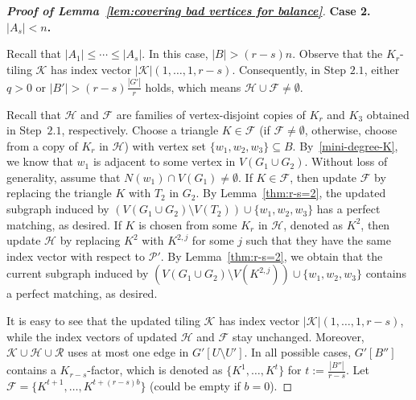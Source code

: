 \documentclass[11pt, a4paper]{article}
\theoremstyle{definition}
\newcommand{\<}{\subseteq}
\begin{document}
\begin{proof}[{\bf Proof of Lemma~\ref{lem:covering bad vertices for balance}}]
\medskip
{\bf Case 2. $|A_s|<n$.}
\medskip

{Recall that $|A_1|\le \cdots\le |A_s|$. In this case,  $|B|>(r-s)n$. Observe that the $K_r$-tiling  $\mathcal{K}$ has index vector $|\mathcal{K}|(1,\ldots,1,r-s)$. Consequently, in Step $2.1$, either $q>0$  or $|B'|>(r-s)\frac{|G'|}{r}$ holds, which means \(\mathcal{H} \cup \mathcal{F} \ne \emptyset\).}

{Recall that $\mathcal{H}$ and $\mathcal{F}$ are families of vertex-disjoint copies of $K_r$ and $K_3$ obtained in Step~$2.1$, respectively.}
Choose a triangle $K\in \mathcal{F}$ (if $\mathcal{F}\neq \emptyset$, otherwise, choose from a {copy of} $K_r$ in $\mathcal{H}$) with vertex set $\{w_1,w_2,w_3\}\<B$. By~\eqref{mini-degree-K}, we know that $w_1$ is adjacent to some vertex in $V(G_1\cup G_2)$. Without loss of generality, assume that $N(w_1)\cap V(G_1)\neq \emptyset$.  If $K\in\mathcal{F}$, then update $\mathcal{F}$ by replacing the triangle $K$ with $T_2$ in $G_{2}$. By Lemma~\ref{thm:r-s=2}, the updated subgraph induced by  {$ (V(G_1\cup G_2)\setminus   V(T_2))\cup \{w_1,w_2,w_3\}$} has a perfect matching, as desired. If $K$ is chosen from some $K_r$ in $\mathcal{H}$, denoted as $K^2$, then update $\mathcal{H}$ by replacing $K^2$ with $K^{2,j}$ for some $j$ such that they have the same index vector {with respect to $\mathcal{P}'$}. By Lemma~\ref{thm:r-s=2}, we obtain that the current subgraph induced by  $(V(G_1\cup G_2)\setminus V(K^{2,j}))\cup \{w_1,w_2,w_3\}$ contains a perfect matching, as desired. \medskip

It is easy to see that the updated tiling  $\mathcal{K}$ has index vector $|\mathcal{K}|(1,\ldots,1,r-s)$, while the index vectors of updated $\mathcal{H}$ and $\mathcal{F}$ stay unchanged. Moreover,  $\mathcal{K}\cup \mathcal{H}\cup \mathcal{R}$ uses at most one edge in $G'[U\setminus U']$. In all possible cases, \(G'[B'']\) contains a $K_{r-s}$-factor, which is denoted as $\{K^1,\ldots,K^{t}\}$ for $t:=\frac{|B''|}{r-s}$. Let  $\mathcal{F}=\{K^{t+1},\ldots,K^{t
+(r-s)b}\}$ (could be empty if $b=0$).

\medskip
{} 



\end{proof}
\end{document}
